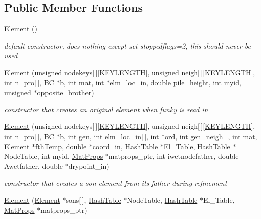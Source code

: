 \subsection*{Public Member Functions}
\begin{CompactItemize}
\item 
\hyperlink{classElement_a0}{Element} ()
\begin{CompactList}\small\item\em default constructor, does nothing except set stoppedflags=2, this should never be used \item\end{CompactList}\item 
\hyperlink{classElement_a1}{Element} (unsigned nodekeys\mbox{[}$\,$\mbox{]}\mbox{[}\hyperlink{constant_8h_a10}{KEYLENGTH}\mbox{]}, unsigned neigh\mbox{[}$\,$\mbox{]}\mbox{[}\hyperlink{constant_8h_a10}{KEYLENGTH}\mbox{]}, int n\_\-pro\mbox{[}$\,$\mbox{]}, \hyperlink{structBC}{BC} $\ast$b, int mat, int $\ast$elm\_\-loc\_\-in, double pile\_\-height, int myid, unsigned $\ast$opposite\_\-brother)
\begin{CompactList}\small\item\em constructor that creates an original element when funky is read in \item\end{CompactList}\item 
\hyperlink{classElement_a2}{Element} (unsigned nodekeys\mbox{[}$\,$\mbox{]}\mbox{[}\hyperlink{constant_8h_a10}{KEYLENGTH}\mbox{]}, unsigned neigh\mbox{[}$\,$\mbox{]}\mbox{[}\hyperlink{constant_8h_a10}{KEYLENGTH}\mbox{]}, int n\_\-pro\mbox{[}$\,$\mbox{]}, \hyperlink{structBC}{BC} $\ast$b, int gen, int elm\_\-loc\_\-in\mbox{[}$\,$\mbox{]}, int $\ast$ord, int gen\_\-neigh\mbox{[}$\,$\mbox{]}, int mat, \hyperlink{classElement}{Element} $\ast$fth\-Temp, double $\ast$coord\_\-in, \hyperlink{classHashTable}{Hash\-Table} $\ast$El\_\-Table, \hyperlink{classHashTable}{Hash\-Table} $\ast$Node\-Table, int myid, \hyperlink{structMatProps}{Mat\-Props} $\ast$matprops\_\-ptr, int iwetnodefather, double Awetfather, double $\ast$drypoint\_\-in)
\begin{CompactList}\small\item\em constructor that creates a son element from its father during refinement \item\end{CompactList}\item 
\hyperlink{classElement_a3}{Element} (\hyperlink{classElement}{Element} $\ast$sons\mbox{[}$\,$\mbox{]}, \hyperlink{classHashTable}{Hash\-Table} $\ast$Node\-Table, \hyperlink{classHashTable}{Hash\-Table} $\ast$El\_\-Table, \hyperlink{structMatProps}{Mat\-Props} $\ast$matprops\_\-ptr)

\end{CompactItemize}
